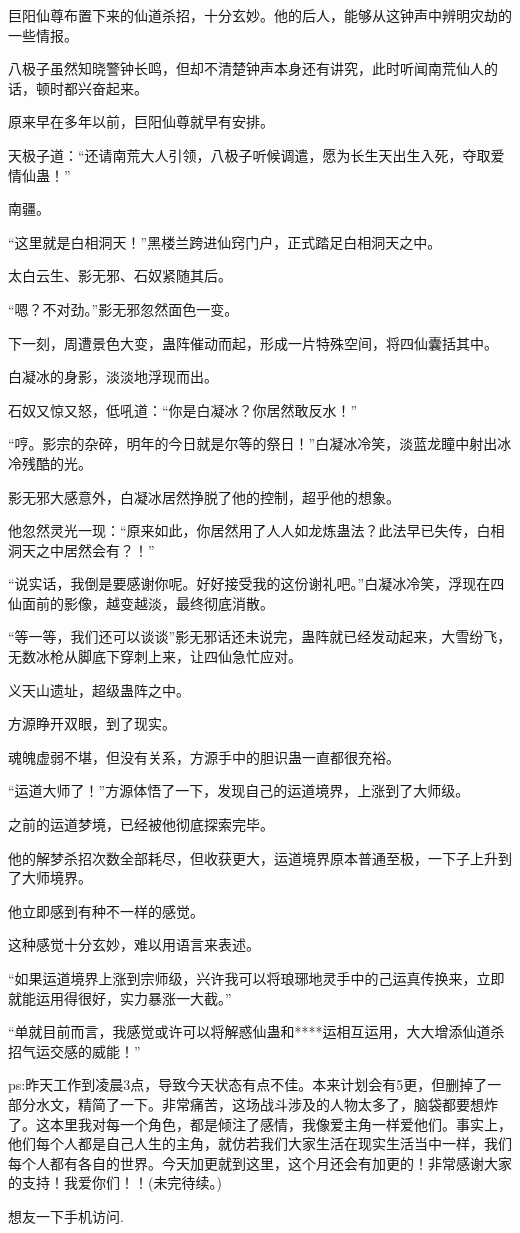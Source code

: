 \begin{this_body}
巨阳仙尊布置下来的仙道杀招，十分玄妙。他的后人，能够从这钟声中辨明灾劫的一些情报。

八极子虽然知晓警钟长鸣，但却不清楚钟声本身还有讲究，此时听闻南荒仙人的话，顿时都兴奋起来。

原来早在多年以前，巨阳仙尊就早有安排。

天极子道：“还请南荒大人引领，八极子听候调遣，愿为长生天出生入死，夺取爱情仙蛊！”

南疆。

“这里就是白相洞天！”黑楼兰跨进仙窍门户，正式踏足白相洞天之中。

太白云生、影无邪、石奴紧随其后。

“嗯？不对劲。”影无邪忽然面色一变。

下一刻，周遭景色大变，蛊阵催动而起，形成一片特殊空间，将四仙囊括其中。

白凝冰的身影，淡淡地浮现而出。

石奴又惊又怒，低吼道：“你是白凝冰？你居然敢反水！”

“哼。影宗的杂碎，明年的今日就是尔等的祭日！”白凝冰冷笑，淡蓝龙瞳中射出冰冷残酷的光。

影无邪大感意外，白凝冰居然挣脱了他的控制，超乎他的想象。

他忽然灵光一现：“原来如此，你居然用了人人如龙炼蛊法？此法早已失传，白相洞天之中居然会有？！”

“说实话，我倒是要感谢你呢。好好接受我的这份谢礼吧。”白凝冰冷笑，浮现在四仙面前的影像，越变越淡，最终彻底消散。

“等一等，我们还可以谈谈”影无邪话还未说完，蛊阵就已经发动起来，大雪纷飞，无数冰枪从脚底下穿刺上来，让四仙急忙应对。

义天山遗址，超级蛊阵之中。

方源睁开双眼，到了现实。

魂魄虚弱不堪，但没有关系，方源手中的胆识蛊一直都很充裕。

“运道大师了！”方源体悟了一下，发现自己的运道境界，上涨到了大师级。

之前的运道梦境，已经被他彻底探索完毕。

他的解梦杀招次数全部耗尽，但收获更大，运道境界原本普通至极，一下子上升到了大师境界。

他立即感到有种不一样的感觉。

这种感觉十分玄妙，难以用语言来表述。

“如果运道境界上涨到宗师级，兴许我可以将琅琊地灵手中的己运真传换来，立即就能运用得很好，实力暴涨一大截。”

“单就目前而言，我感觉或许可以将解惑仙蛊和****运相互运用，大大增添仙道杀招气运交感的威能！”

ps:昨天工作到凌晨3点，导致今天状态有点不佳。本来计划会有5更，但删掉了一部分水文，精简了一下。非常痛苦，这场战斗涉及的人物太多了，脑袋都要想炸了。这本里我对每一个角色，都是倾注了感情，我像爱主角一样爱他们。事实上，他们每个人都是自己人生的主角，就仿若我们大家生活在现实生活当中一样，我们每个人都有各自的世界。今天加更就到这里，这个月还会有加更的！非常感谢大家的支持！我爱你们！！(未完待续。)

想友一下手机访问.

\end{this_body}

